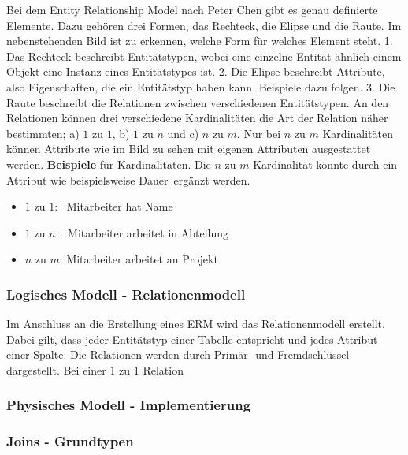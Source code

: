 Bei dem Entity Relationship Model nach Peter Chen gibt es genau definierte Elemente. Dazu gehören drei Formen, das Rechteck, die Elipse und die Raute. Im nebenstehenden Bild ist zu erkennen, welche Form für welches Element steht. 1. Das Rechteck beschreibt Entitätstypen, wobei eine einzelne Entität ähnlich einem Objekt eine Instanz eines Entitätstypes ist. 2. Die Elipse beschreibt Attribute, also Eigenschaften, die ein Entitätstyp haben kann. Beispiele dazu folgen. 3. Die Raute beschreibt die Relationen zwischen verschiedenen Entitätstypen. An den Relationen können drei verschiedene Kardinalitäten die Art der Relation näher bestimmten; a) $1$ zu $1$, b) $1$ zu $n$ und c) $n$ zu $m$. Nur bei $n$ zu $m$ Kardinalitäten können Attribute wie im Bild zu sehen mit eigenen Attributen ausgestattet werden. {\bf Beispiele} für Kardinalitäten. Die $n$ zu $m$ Kardinalität könnte durch ein Attribut wie beispielsweise \ql Dauer\qr\ ergänzt werden.
\begin{itemize}
	\itemsep0em
	\item $1$ zu $1$: \ {\sc Mitarbeiter} hat {\sc Name}
	\item $1$ zu $n$: \ {\sc Mitarbeiter} arbeitet in {\sc Abteilung}
	\item $n$ zu $m$: {\sc Mitarbeiter} arbeitet an {\sc Projekt}
\end{itemize}

\subsubsection{Logisches Modell - Relationenmodell}

Im Anschluss an die Erstellung eines ERM wird das Relationenmodell erstellt. Dabei gilt, dass jeder Entitätstyp einer Tabelle entspricht und jedes Attribut einer Spalte. Die Relationen werden durch Primär- und Fremdschlüssel dargestellt. Bei einer $1$ zu $1$ Relation 

\subsubsection{Physisches Modell - Implementierung}


\subsubsection{Joins - Grundtypen}

